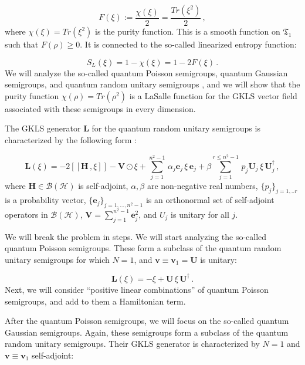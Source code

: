 \documentclass[11pt]{article}
\newcommand{\be}{\begin{equation}}
\newcommand{\ee}{\end{equation}}
\begin{document}
\be
F(\xi):=\frac{\chi(\xi)}{2}=\frac{Tr(\xi^{2})}{2}\,,
\ee
where $\chi(\xi)=Tr(\xi^{2})$ is the  purity function.
This is a smooth function on $\mathfrak{T}_{1}$ such that $F(\rho)\geq0$.
It is connected to the so-called linearized entropy function:

\be
S_{L}(\xi)=1-\chi(\xi)=1-2F(\xi)\,.
\ee
We will analyze the so-called quantum Poisson semigroups, quantum Gaussian semigroups, and quantum random unitary semigroups \cite{lindblad-on_the_generators_of_quantum_dynamical_semigroups, kossakowski-on_quantum_statistical_mechanics_of_non_hamiltonian_systems, aniello_kossakowski_marmo_ventriglia-quantum_brownian_motion_on_lie_groups_and_open_quantum_systems}, and we will show that the purity function $\chi(\rho)=Tr(\rho^{2})$ is a LaSalle function for the GKLS vector field associated with these semigroups in every dimension.

The GKLS generator $\mathbf{L}$ for the quantum random unitary semigroups is characterized by the following form \cite{aniello_kossakowski_marmo_ventriglia-quantum_brownian_motion_on_lie_groups_and_open_quantum_systems} :

\be
\mathbf{L}(\xi)=-2[[\mathbf{H}\,,\xi]] - \mathbf{V}\odot\xi + \sum_{j=1}^{n^{2}-1}\,\alpha_{j}\mathbf{e}_{j}\,\xi\,\mathbf{e}_{j} + \beta\sum_{j=1}^{r\leq n^{2}-1}\,p_{j}\mathbf{U}_{j}\,\xi\,\mathbf{U}_{j}^{\dagger}\,,
\ee
where $\mathbf{H}\in\mathcal{B}(\mathcal{H})$ is self-adjoint, $\alpha,\beta$ are non-negative real numbers, $\{p_{j}\}_{j=1,..r}$ is a probability vector, $\{\mathbf{e}_{j}\}_{j=1,...,n^{2}-1}$ is an orthonormal set of self-adjoint operators in $\mathcal{B}(\mathcal{H})$, $\mathbf{V}=\sum_{j=1}^{n^{2}-1}\mathbf{e}_{j}^{2}$, and $U_{j}$ is unitary for all $j$.

We will break the problem in steps.
We will start analyzing the so-called quantum Poisson semigroups.
These form a subclass of the quantum random unitary semigroups for which $N=1$, and $\mathbf{v}\equiv\mathbf{v}_{1}=\mathbf{U}$ is unitary:

\be
\mathbf{L}(\xi)= - \xi +  \mathbf{U}\,\xi\, \mathbf{U}^{\dagger}\,.
\ee
Next, we will consider ``positive linear combinations'' of quantum Poisson semigroups, and add to them a Hamiltonian term.

After the quantum Poisson semigroups, we will focus on the so-called quantum Gaussian semigroups.
Again, these semigroups form a subclass of the quantum random unitary semigroups.
Their GKLS generator is characterized by $N=1$ and $\mathbf{v}\equiv \mathbf{v}_{1}$ self-adjoint:
\end{document}

